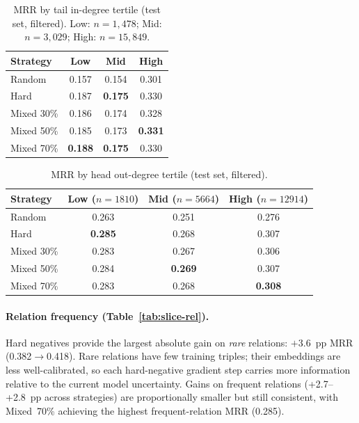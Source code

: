 \documentclass[10pt,twocolumn,letterpaper]{article}
\begin{document}
\begin{table}[h]
\centering\scriptsize
\caption{MRR by tail in-degree tertile (test set, filtered).
Low: $n=1{,}478$; Mid: $n=3{,}029$; High: $n=15{,}849$.}
\label{tab:slice-tail}
\begin{tabular}{@{}lccc@{}}
\toprule
Strategy & Low & Mid & High \\
\midrule
Random     & 0.157 & 0.154 & 0.301 \\
Hard       & 0.187 & \textbf{0.175} & 0.330 \\
Mixed 30\% & 0.186 & 0.174 & 0.328 \\
Mixed 50\% & 0.185 & 0.173 & \textbf{0.331} \\
Mixed 70\% & \textbf{0.188} & \textbf{0.175} & 0.330 \\
\bottomrule
\end{tabular}
\end{table}

\begin{table}[h]
\centering\scriptsize
\caption{MRR by head out-degree tertile (test set, filtered).}
\label{tab:slice-head}
\begin{tabular}{@{}lccc@{}}
\toprule
Strategy & Low ($n=1810$) & Mid ($n=5664$) & High ($n=12914$) \\
\midrule
Random   & 0.263 & 0.251 & 0.276 \\
Hard     & \textbf{0.285} & 0.268 & 0.307 \\
Mixed 30\% & 0.283 & 0.267 & 0.306 \\
Mixed 50\% & 0.284 & \textbf{0.269} & 0.307 \\
Mixed 70\% & 0.283 & 0.268 & \textbf{0.308} \\
\bottomrule
\end{tabular}
\end{table}

\paragraph{Relation frequency (Table~\ref{tab:slice-rel}).}
Hard negatives provide the largest absolute gain on \emph{rare} relations:
$+3.6$~pp MRR (0.382$\to$0.418). Rare relations have few training triples;
their embeddings are less well-calibrated, so each hard-negative gradient step
carries more information relative to the current model uncertainty. Gains on
frequent relations (+2.7--+2.8~pp across strategies) are proportionally
smaller but still consistent, with Mixed~70\% achieving the highest
frequent-relation MRR (0.285).
\end{document}
